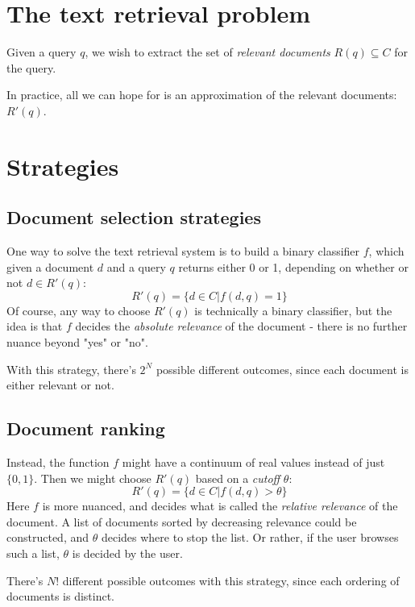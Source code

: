 \documentclass[12pt, a4paper]{article}
\numberwithin{equation}{section}
\begin{document}
\section{The text retrieval problem}
Given a query $q$, we wish to extract the set of \textit{relevant documents} $R(q)\subseteq C$ for the query.

In practice, all we can hope for is an approximation of the relevant documents: $R'(q)$.

\section{Strategies}

\subsection{Document selection strategies}
One way to solve the text retrieval system is to build a binary classifier $f$, which given a document $d$ and a query $q$ returns either 0 or 1, depending on whether or not $d\in R'(q)$:
\begin{equation}
R'(q)=\{d\in C|f(d,q)=1\}
\end{equation}
Of course, any way to choose $R'(q)$ is technically a binary classifier, but the idea is that $f$ decides the \textit{absolute relevance} of the document - there is no further nuance beyond "yes" or "no".

With this strategy, there's $2^N$ possible different outcomes, since each document is either relevant or not.

\subsection{Document ranking}
Instead, the function $f$ might have a continuum of real values instead of just $\{0, 1\}$. Then we might choose $R'(q)$ based on a \textit{cutoff} $\theta$:
\begin{equation}
R'(q)=\{d\in C|f(d,q)>\theta\}
\end{equation}
Here $f$ is more nuanced, and decides what is called the \textit{relative relevance} of the document. A list of documents sorted by decreasing relevance could be constructed, and $\theta$ decides where to stop the list. Or rather, if the user browses such a list, $\theta$ is decided by the user.

There's $N!$ different possible outcomes with this strategy, since each ordering of documents is distinct.
\end{document}
